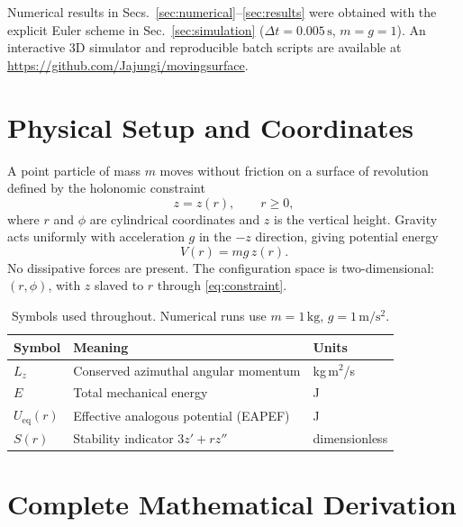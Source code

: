 \documentclass[11pt,letterpaper]{article}
\begin{document}
Numerical results in Secs.~\ref{sec:numerical}--\ref{sec:results} were obtained with the explicit Euler scheme in Sec.~\ref{sec:simulation} ($\Delta t=0.005\,\mathrm{s}$, $m=g=1$). An interactive 3D simulator and reproducible batch scripts are available at \url{https://github.com/Jajungi/movingsurface}.

\section{Physical Setup and Coordinates}

A point particle of mass $m$ moves without friction on a surface of revolution defined by the holonomic constraint
\begin{equation}\label{eq:constraint}
    z = z(r), \qquad r\ge 0,
\end{equation}
where $r$ and $\phi$ are cylindrical coordinates and $z$ is the vertical height. Gravity acts uniformly with acceleration $g$ in the $-z$ direction, giving potential energy
\begin{equation}\label{eq:V}
    V(r) = mg\,z(r).
\end{equation}
No dissipative forces are present. The configuration space is two-dimensional: $(r,\phi)$, with $z$ slaved to $r$ through \eqref{eq:constraint}.

\begin{table}[htbp]
    \centering
    \caption{Symbols used throughout. Numerical runs use $m=1\,\mathrm{kg}$, $g=1\,\mathrm{m/s^2}$.}
    \label{tab:symbols}
    \begin{tabular}{lll}
        \toprule
        Symbol & Meaning & Units \\
        \midrule
        $L_z$ & Conserved azimuthal angular momentum & kg\,m$^2$/s \\
        $E$ & Total mechanical energy & J \\
        $U_{\mathrm{eq}}(r)$ & Effective analogous potential (EAPEF) & J \\
        $S(r)$ & Stability indicator $3z'+rz''$ & dimensionless \\
        \bottomrule
    \end{tabular}
\end{table}

\section{Complete Mathematical Derivation}
\end{document}
